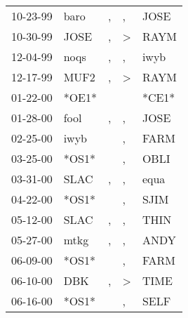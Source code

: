 \begin{supertabular}{p{0.07\textwidth}p{0.06\textwidth}p{0.02\textwidth}p{0.02\textwidth}p{0.06\textwidth}}
          10-23-99\textsuperscript{} &           baro\textsuperscript{} &             , &             , &          JOSE\textsuperscript{} \\
          10-30-99\textsuperscript{} &           JOSE\textsuperscript{} &             , &  \textgreater &          RAYM\textsuperscript{} \\
          12-04-99\textsuperscript{} &           noqs\textsuperscript{} &             , &             , &          iwyb\textsuperscript{} \\
          12-17-99\textsuperscript{} &           MUF2\textsuperscript{} &             , &  \textgreater &          RAYM\textsuperscript{} \\
          01-22-00\textsuperscript{} &                            *OE1* &               &               &                           *CE1* \\
          01-28-00\textsuperscript{} &           fool\textsuperscript{} &             , &             , &          JOSE\textsuperscript{} \\
          02-25-00\textsuperscript{} &           iwyb\textsuperscript{} &               &             , &          FARM\textsuperscript{} \\
          03-25-00\textsuperscript{} &                            *OS1* &               &             , &          OBLI\textsuperscript{} \\
          03-31-00\textsuperscript{} &           SLAC\textsuperscript{} &             , &             , &          equa\textsuperscript{} \\
          04-22-00\textsuperscript{} &                            *OS1* &               &             , &          SJIM\textsuperscript{} \\
          05-12-00\textsuperscript{} &           SLAC\textsuperscript{} &             , &             , &          THIN\textsuperscript{} \\
          05-27-00\textsuperscript{} &           mtkg\textsuperscript{} &             , &             , &          ANDY\textsuperscript{} \\
          06-09-00\textsuperscript{} &                            *OS1* &               &             , &          FARM\textsuperscript{} \\
          06-10-00\textsuperscript{} &            DBK\textsuperscript{} &             , &  \textgreater &          TIME\textsuperscript{} \\
          06-16-00\textsuperscript{} &                            *OS1* &               &             , &          SELF\textsuperscript{} \\

\end{supertabular}
